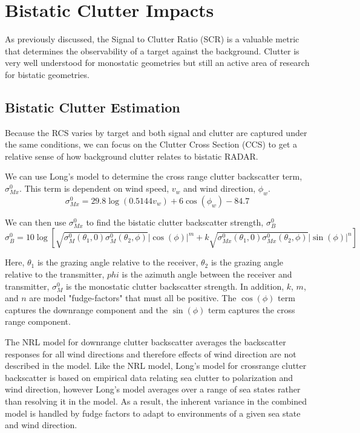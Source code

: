 \section{Bistatic Clutter Impacts}

As previously discussed, the Signal to Clutter Ratio (SCR) is a valuable metric that determines the observability of a target against the background. Clutter is very well understood for monostatic geometries but still an active area of research for bistatic geometries.

\subsection {Bistatic Clutter Estimation}
Because the RCS varies by target and both signal and clutter are captured under the same conditions, we can focus on the Clutter Cross Section (CCS) to get a relative sense of how background clutter relates to bistatic RADAR.

We can use Long's model to determine the cross range clutter backscatter term, $\sigma_{Mx}^0$. This term is dependent on wind speed, $v_w$ and wind direction, $\phi_w$.
\begin{equation}
\sigma_{Mx}^0 = 29.8\log\left(0.5144 v_w\right) + 6\cos\left(\phi_w \right) -84.7
\label{bc_eq:1}
\end{equation}
\renewcommand{\baselinestretch}{2} \small\normalsize

We can then use $\sigma_{Mx}^0$ to find the bistatic clutter backscatter strength, $\sigma_{B}^0$
\begin{equation}
\sigma_B^0 = 10\log\left[\sqrt{\sigma_M^0(\theta_1,0)\sigma_M^0(\theta_2,\phi)} |\cos(\phi)|^m  + k\sqrt{\sigma_{Mx}^0(\theta_1,0)\sigma_{Mx}^0(\theta_2,\phi)}|\sin(\phi)|^n \right]
\label{bc_eq:2}
\end{equation}
\renewcommand{\baselinestretch}{2} \small\normalsize

Here, $\theta_1$ is the grazing angle relative to the receiver, $\theta_2$ is the grazing angle relative to the transmitter, $phi$ is the azimuth angle between the receiver and transmitter, $\sigma_M^0$ is the monostatic clutter backscatter strength. In addition, $k$, $m$, and $n$ are model "fudge-factors" that must all be positive. The $\cos(\phi)$ term captures the downrange component and the $\sin(\phi)$ term captures the cross range component.

The NRL model for downrange clutter backscatter averages the backscatter responses for all wind directions and therefore effects of wind direction are not described in the model. Like the NRL model, Long's model for crossrange clutter backscatter is based on empirical data relating sea clutter to polarization and wind direction, however Long's model averages over a range of sea states rather than resolving it in the model. As a result, the inherent variance in the combined model is handled by fudge factors to adapt to environments of a given sea state and wind direction.

